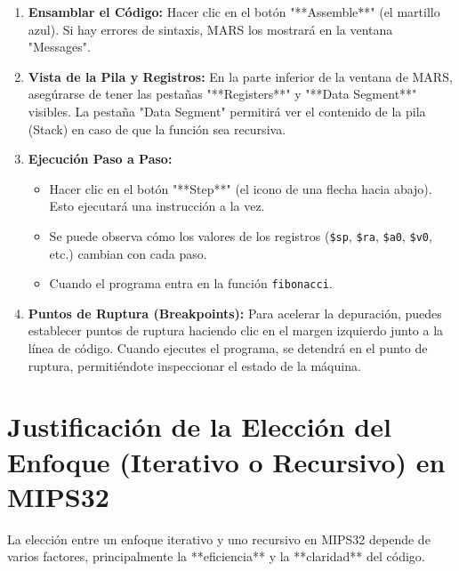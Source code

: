 \documentclass{article}
\begin{document}
\begin{enumerate}
    \item \textbf{Ensamblar el Código:} Hacer clic en el botón "**Assemble**" (el martillo azul). Si hay errores de sintaxis, MARS los mostrará en la ventana "Messages". 
    \item \textbf{Vista de la Pila y Registros:} En la parte inferior de la ventana de MARS, asegúrarse de tener las pestañas "**Registers**" y "**Data Segment**" visibles. La pestaña "Data Segment" permitirá ver el contenido de la pila (Stack) en caso de que la función sea recursiva.
    \item \textbf{Ejecución Paso a Paso:}
    \begin{itemize}
        \item Hacer clic en el botón "**Step**" (el icono de una flecha hacia abajo). Esto ejecutará una instrucción a la vez.
        \item Se puede observa cómo los valores de los registros (\texttt{\$sp}, \texttt{\$ra}, \texttt{\$a0}, \texttt{\$v0}, etc.) cambian con cada paso.
        \item Cuando el programa entra en la función \texttt{fibonacci}.
       
    \end{itemize}
    \item \textbf{Puntos de Ruptura (Breakpoints):} Para acelerar la depuración, puedes establecer puntos de ruptura haciendo clic en el margen izquierdo junto a la línea de código. Cuando ejecutes el programa, se detendrá en el punto de ruptura, permitiéndote inspeccionar el estado de la máquina.
\end{enumerate}

\section{Justificación de la Elección del Enfoque (Iterativo o Recursivo) en MIPS32}

La elección entre un enfoque iterativo y uno recursivo en MIPS32 depende de varios factores, principalmente la **eficiencia** y la **claridad** del código.
\end{document}
